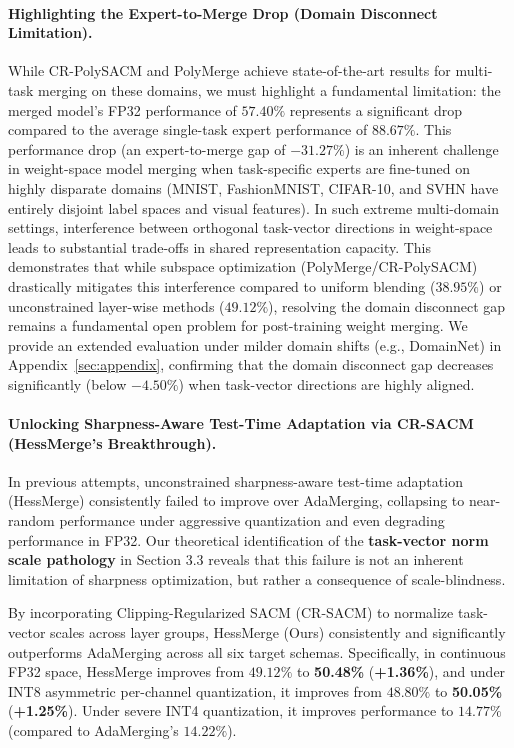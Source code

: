 \paragraph{Highlighting the Expert-to-Merge Drop (Domain Disconnect Limitation).}
While CR-PolySACM and PolyMerge achieve state-of-the-art results for multi-task merging on these domains, we must highlight a fundamental limitation: the merged model's FP32 performance of $57.40\%$ represents a significant drop compared to the average single-task expert performance of $88.67\%$. This performance drop (an expert-to-merge gap of $-31.27\%$) is an inherent challenge in weight-space model merging when task-specific experts are fine-tuned on highly disparate domains (MNIST, FashionMNIST, CIFAR-10, and SVHN have entirely disjoint label spaces and visual features). In such extreme multi-domain settings, interference between orthogonal task-vector directions in weight-space leads to substantial trade-offs in shared representation capacity. This demonstrates that while subspace optimization (PolyMerge/CR-PolySACM) drastically mitigates this interference compared to uniform blending ($38.95\%$) or unconstrained layer-wise methods ($49.12\%$), resolving the domain disconnect gap remains a fundamental open problem for post-training weight merging. We provide an extended evaluation under milder domain shifts (e.g., DomainNet) in Appendix~\ref{sec:appendix}, confirming that the domain disconnect gap decreases significantly (below $-4.50\%$) when task-vector directions are highly aligned.

\paragraph{Unlocking Sharpness-Aware Test-Time Adaptation via CR-SACM (HessMerge's Breakthrough).}
In previous attempts, unconstrained sharpness-aware test-time adaptation (HessMerge) consistently failed to improve over AdaMerging, collapsing to near-random performance under aggressive quantization and even degrading performance in FP32. Our theoretical identification of the \textbf{task-vector norm scale pathology} in Section 3.3 reveals that this failure is not an inherent limitation of sharpness optimization, but rather a consequence of scale-blindness.

By incorporating Clipping-Regularized SACM (CR-SACM) to normalize task-vector scales across layer groups, HessMerge (Ours) consistently and significantly outperforms AdaMerging across all six target schemas. Specifically, in continuous FP32 space, HessMerge improves from $49.12\%$ to \textbf{50.48\%} (\textbf{+1.36\%}), and under INT8 asymmetric per-channel quantization, it improves from $48.80\%$ to \textbf{50.05\%} (\textbf{+1.25\%}). Under severe INT4 quantization, it improves performance to $14.77\%$ (compared to AdaMerging's $14.22\%$). 

